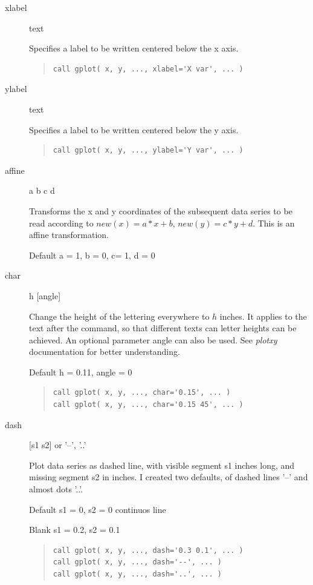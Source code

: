 \documentclass{article}
\begin{document}
\begin{description}
\item[xlabel] text

Specifies a label to be written centered below the x axis.
\begin{quote}
\begin{verbatim}
call gplot( x, y, ..., xlabel='X var', ... )
\end{verbatim}
\end{quote}

\item[ylabel] text

Specifies a label to be written centered below the y axis.
\begin{quote}
\begin{verbatim}
call gplot( x, y, ..., ylabel='Y var', ... )
\end{verbatim}
\end{quote}

\item[affine] a b c d

Transforms the x and y coordinates of the subsequent data series to be read according to 
$ new(x) = a*x + b$, $new(y) = c*y + d$. This is an affine transformation. 

Default a = 1, b = 0, c= 1, d = 0

\item[char] h [angle]

Change the height of the lettering everywhere to $h$ inches. It applies to the text after the command, so that different texts can letter heights can be achieved. An optional parameter angle can also be used. See {\it plotxy} documentation for better understanding. 

Default h = 0.11, angle = 0
\begin{quote}
\begin{verbatim}
call gplot( x, y, ..., char='0.15', ... )
call gplot( x, y, ..., char='0.15 45', ... )
\end{verbatim}
\end{quote}

\item[dash] [s1 s2] or '--', '..'

Plot data series as dashed line, with visible segment s1 inches long, and missing segment s2 in inches. I created two defaults, of dashed lines '--' and almost dots '..'. 

Default s1  = 0, s2 = 0    continuos line

Blank s1 = 0.2, s2 = 0.1
\begin{quote}
\begin{verbatim}
call gplot( x, y, ..., dash='0.3 0.1', ... )
call gplot( x, y, ..., dash='--', ... )
call gplot( x, y, ..., dash='..', ... )
\end{verbatim}
\end{quote}


\end{description}
\end{document}
